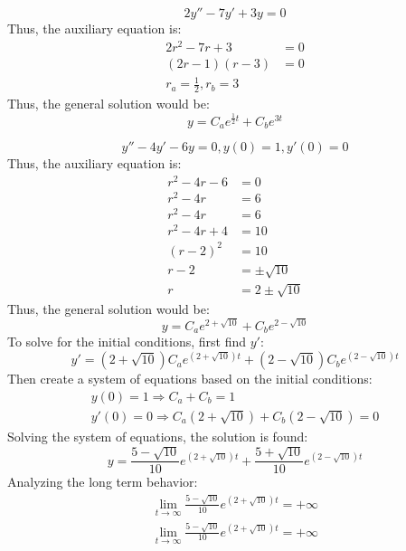 \documentclass[12pt]{article}
\begin{document}
\begin{example}
  \begin{equation*}
    2y'' - 7y' + 3y = 0
  \end{equation*}
  Thus, the auxiliary equation is:
  \begin{align*}
    2r^2 - 7r + 3 &= 0 \\
    (2r-1)(r-3) &= 0 \\
    r_a = \frac{1}{2}, r_b = 3
  \end{align*}
  Thus, the general solution would be:
  \begin{equation*}
    y = C_ae^{\frac{1}{2}t} + C_be^{3t}
  \end{equation*}
\end{example}

\begin{example}
  \begin{equation*}
    y'' - 4y' - 6y = 0, y(0) = 1, y'(0) = 0
  \end{equation*}
  Thus, the auxiliary equation is:
  \begin{align*}
    r^2 - 4r - 6  &= 0  \\
    r^2 - 4r      &= 6  \\
    r^2 - 4r      &= 6 \\
    r^2 - 4r + 4  &= 10 \\
    (r-2)^2       &= 10 \\
    r-2           &= \pm \sqrt{10} \\
    r             &= 2 \pm \sqrt{10}
  \end{align*}
  Thus, the general solution would be:
  \begin{equation*}
    y = C_ae^{2 + \sqrt{10}} + C_be^{2 - \sqrt{10}}
  \end{equation*}
  To solve for the initial conditions, first find $y'$:
  \begin{equation*}
    y' = (2 + \sqrt{10})C_ae^{(2 + \sqrt{10})t} + (2 - \sqrt{10})C_be^{(2 - \sqrt{10})t}
  \end{equation*}
  Then create a system of equations based on the initial conditions:
  \begin{gather*}
    y(0) = 1 \Rightarrow C_a + C_b = 1 \\
    y'(0) = 0 \Rightarrow C_a(2 + \sqrt{10}) + C_b(2 - \sqrt{10}) = 0
  \end{gather*}
  Solving the system of equations, the solution is found:
  \begin{equation*}
    y = \frac{5 - \sqrt{10}}{10}e^{(2 + \sqrt{10})t} + \frac{5 + \sqrt{10}}{10}e^{(2 - \sqrt{10})t}
  \end{equation*}
  Analyzing the long term behavior:
  \begin{gather*}
    \lim_{t \to \infty} \frac{5 - \sqrt{10}}{10}e^{(2 + \sqrt{10})t} = +\infty \\
    \lim_{t \to \infty} \frac{5 - \sqrt{10}}{10}e^{(2 + \sqrt{10})t} = +\infty \\
  \end{gather*}
\end{example}
\end{document}
